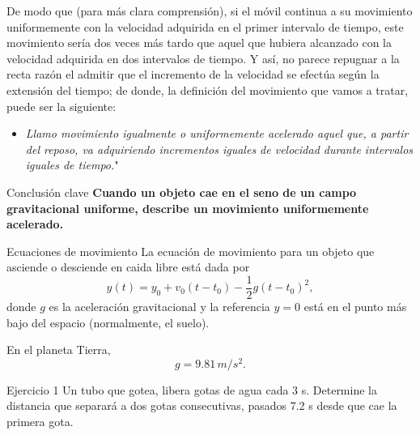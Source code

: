 \begin{frame}
    De 
modo que (para más clara comprensión), si el móvil continua 
a su movimiento uniformemente con la velocidad adquirida 
en el primer intervalo de tiempo, este movimiento sería dos 
veces más tardo que aquel que hubiera alcanzado con la velocidad 
adquirida en dos intervalos de tiempo. Y así, no parece 
repugnar a la recta razón el admitir que el incremento de la velocidad 
se efectúa según la extensión del tiempo; de donde, la
definición del movimiento que vamos a tratar, puede ser la siguiente: 

\bigskip

\begin{itemize}
    \item[] \textit{Llamo movimiento igualmente o uniformemente acelerado 
aquel que, a partir del reposo, va adquiriendo incrementos 
iguales de velocidad durante intervalos iguales de tiempo.}"
\end{itemize}

\bigskip
\bigskip


\end{frame}

\begin{frame}{Conclusión clave}
    \LARGE \textbf{Cuando un objeto cae en el seno de un campo gravitacional uniforme, describe un movimiento uniformemente acelerado.}
\end{frame}

\begin{frame}{Ecuaciones de movimiento}
    La ecuación de movimiento para un objeto que asciende o desciende en caida libre está dada por \begin{equation}
        y(t)=y_0+v_0(t-t_0)-\frac{1}{2}g(t-t_0)^2,
    \end{equation} donde $g$ es la aceleración gravitacional y la referencia $y=0$ está en el punto más bajo del espacio (normalmente, el suelo).
    
    \vspace{1em}
    
    En el planeta Tierra, $$g=\num{9.81}\,\unit{m}/\unit{s}^2.$$
\end{frame}

\begin{frame}{Ejercicio 1}
    Un tubo que gotea, libera gotas de agua cada 3 s. Determine la distancia que separará a dos gotas consecutivas, pasados 7.2 s desde que cae la primera gota.
\end{frame}

